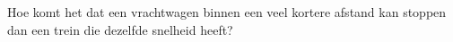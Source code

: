 \item Hoe komt het dat een vrachtwagen binnen een veel kortere afstand kan stoppen dan een trein die dezelfde snelheid heeft?